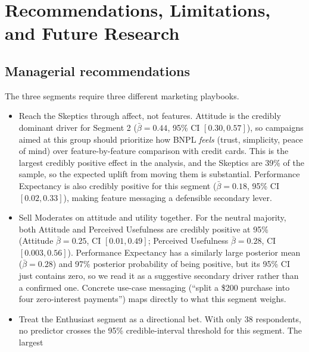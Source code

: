 \documentclass[11pt]{article}
\begin{document}
\section{Recommendations, Limitations, and Future Research}

\subsection{Managerial recommendations}

The three segments require three different marketing playbooks.

\begin{itemize}
  \item Reach the Skeptics through affect, not features. Attitude
        is the credibly dominant driver for Segment 2
        ($\bar{\beta} = 0.44$, 95\% CI $[0.30, 0.57]$), so campaigns
        aimed at this group should prioritize how BNPL \emph{feels}
        (trust, simplicity, peace of mind) over feature-by-feature
        comparison with credit cards. This is the largest credibly
        positive effect in the analysis, and the Skeptics are 39\%
        of the sample, so the expected uplift from moving them is
        substantial. Performance Expectancy is also credibly
        positive for this segment ($\bar{\beta} = 0.18$, 95\% CI
        $[0.02, 0.33]$), making feature messaging a defensible
        secondary lever.
  \item Sell Moderates on attitude and utility together. For the
        neutral majority, both Attitude and Perceived Usefulness
        are credibly positive at 95\% (Attitude
        $\bar{\beta} = 0.25$, CI $[0.01, 0.49]$; Perceived
        Usefulness $\bar{\beta} = 0.28$, CI $[0.003, 0.56]$).
        Performance Expectancy has a similarly large posterior
        mean ($\bar{\beta} = 0.28$) and 97\% posterior probability
        of being positive, but its 95\% CI just contains zero, so
        we read it as a suggestive secondary driver rather than a
        confirmed one. Concrete use-case messaging (``split a
        \$200 purchase into four zero-interest payments'') maps
        directly to what this segment weighs.
  \item Treat the Enthusiast segment as a directional bet. With
        only 38 respondents, no predictor crosses the 95\%
        credible-interval threshold for this segment. The largest

\end{itemize}
\end{document}
